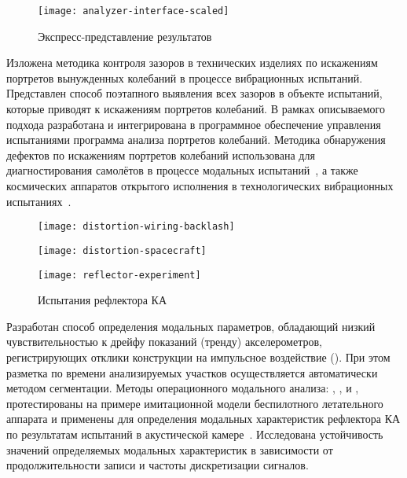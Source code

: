\begin{wrapfigure}[14]{r}{0.6\textwidth}
	\centering
	\texttt{[image: analyzer-interface-scaled]}
	\caption{Экспресс-представление результатов} \label{fig:analyzer-interface}
\end{wrapfigure}

Изложена методика контроля зазоров в технических изделиях по искажениям портретов вынужденных колебаний в процессе вибрационных испытаний. Представлен способ поэтапного выявления всех зазоров в объекте испытаний, которые приводят к искажениям портретов колебаний. В рамках описываемого подхода разработана и интегрирована в программное обеспечение управления испытаниями программа анализа портретов колебаний. Методика обнаружения дефектов по искажениям портретов колебаний использована для диагностирования самолётов в процессе модальных испытаний~, а также космических аппаратов открытого исполнения в технологических вибрационных испытаниях~. 

\begin{figure}[!htb]
	\centering
	\begin{minipage}{0.59\textwidth}
		\centering
		\texttt{[image: distortion-wiring-backlash]} 
		 \label{fig:distortion-wiring-backlash}
	\end{minipage}
	\hfill
	\begin{minipage}{0.4\textwidth}
		\centering
		\texttt{[image: distortion-spacecraft]}
		 \label{fig:distortion-spacecraft}
	\end{minipage}
	\vspace{0.5em}
\end{figure}

\begin{wrapfigure}[10]{r}{0.5\textwidth}
	\begin{center}
		\vspace{-1.4em}
		\texttt{[image: reflector-experiment]}
		\caption{Испытания рефлектора КА} \label{fig:reflector-experiment}
	\end{center}
\end{wrapfigure}

Разработан способ определения модальных параметров, обладающий низкий чувствительностью к дрейфу показаний (тренду) акселерометров, регистрирующих отклики конструкции на импульсное воздействие (). При этом разметка по времени анализируемых участков осуществляется автоматически методом сегментации. Методы операционного модального анализа: , ,  и , протестированы на примере имитационной модели беспилотного летательного аппарата и применены для определения модальных характеристик рефлектора КА по результатам испытаний в акустической камере~. Исследована устойчивость значений определяемых модальных характеристик в зависимости от продолжительности записи и частоты дискретизации сигналов.

